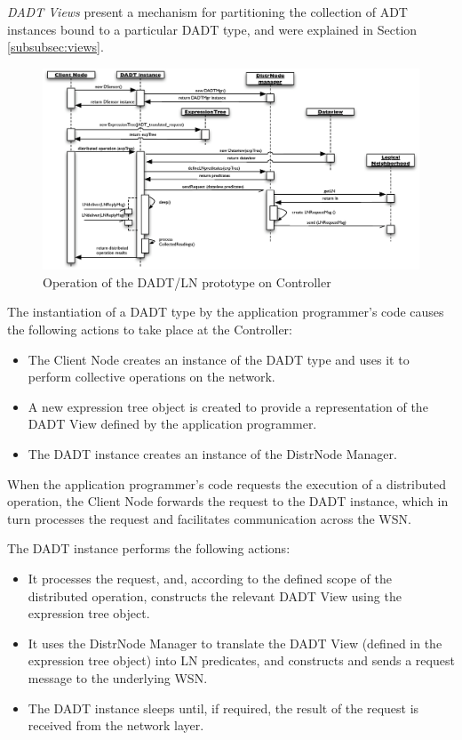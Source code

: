 \emph{DADT Views} present a mechanism for partitioning the collection of
ADT instances bound to a particular DADT type, and were explained in Section
\ref{subsubsec:views}.

\begin{figure}
\centering
\includegraphics[width=\textwidth]{img/SeqDiagram_PCnode.eps}
\caption[Operation of the DADT/LN prototype on Controller]{Operation of the DADT/LN prototype on Controller}
\label{Fig:SeqDiagram_PCnode}
\end{figure}

The instantiation of a DADT type by the application programmer's
code causes the following actions to take place at the Controller:
\begin{itemize}
 \item The Client Node creates an instance of the DADT type and uses it 
 to perform collective operations on the network.
  \item A new expression tree object 
  is created to provide a representation of the DADT View defined by the application
  programmer.
  \item The DADT instance creates an instance of the DistrNode Manager.
\end{itemize}

When the application programmer's code requests the execution of a distributed operation, the Client Node forwards the request to the DADT instance, which in turn
processes the request and facilitates communication across the WSN.

The DADT instance performs the following actions:
  \begin{itemize} 
    \item It processes the request, and, according to the defined scope of the
    distributed operation, constructs the relevant DADT View using the
    expression tree object.
    \item It uses the DistrNode Manager to translate the DADT View
    (defined in the expression tree object) into LN predicates, and constructs and sends a request message to
    the underlying WSN.
    \item The DADT instance sleeps until, if required, the result of
    the request is received from the network layer.
  \end{itemize}
  
